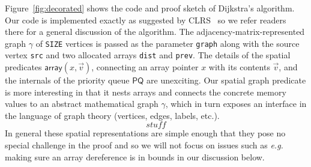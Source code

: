 
Figure~\ref{fig:decorated} shows the code and proof
sketch of Dijkstra's algorithm.  Our code is implemented exactly 
as suggested by CLRS~\cite{clrs} so we refer readers there for a
general discussion of the algorithm.
The adjacency-matrix-represented graph $\gamma$ of \texttt{SIZE} vertices 
is passed as the parameter \texttt{graph} along with the source vertex \texttt{src}
and two allocated arrays \texttt{dist} and \texttt{prev}.
The details of the spatial predicates $\mathsf{array}(x,\vec{v})$, connecting an array pointer $x$ with its contents $\vec{v}$, and the internals of the priority
queue $\mathsf{PQ}$ are unexciting.  Our spatial graph predicate is more interesting in
that it nests arrays and connects the concrete memory values to an abstract mathematical
graph $\gamma$, which in turn exposes an interface in the language of graph theory 
(vertices, edges, labels, etc.).
\[
stuff
\]
In general these spatial representations are simple enough that they pose no special
challenge in the proof and so we will not focus on issues such as \emph{e.g.} making 
sure an array dereference is in bounds in our discussion below.

